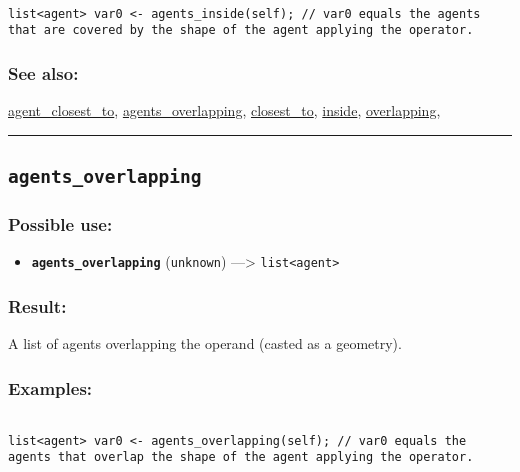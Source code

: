 \documentclass[]{book}
\providecommand{\tightlist}{%
  \setlength{\itemsep}{0pt}\setlength{\parskip}{0pt}}
\theoremstyle{definition}
\theoremstyle{definition}
\theoremstyle{definition}
\theoremstyle{remark}
\begin{document}
\begin{verbatim}
 
list<agent> var0 <- agents_inside(self); // var0 equals the agents that are covered by the shape of the agent applying the operator.
\end{verbatim}

\subsubsection{See also:}\label{see-also-22}

\href{OperatorsAA\#agent_closest_to}{agent\_closest\_to},
\href{OperatorsAA\#agents_overlapping}{agents\_overlapping},
\href{OperatorsBC\#closest_to}{closest\_to},
\href{OperatorsIM\#inside}{inside},
\href{OperatorsNR\#overlapping}{overlapping},

\begin{center}\rule{0.5\linewidth}{\linethickness}\end{center}

\subsection{\texorpdfstring{\texttt{agents\_overlapping}}{agents\_overlapping}}\label{agents_overlapping}

\subsubsection{Possible use:}\label{possible-use-31}

\begin{itemize}
\tightlist
\item
  \textbf{\texttt{agents\_overlapping}} (\texttt{unknown})
  ---\textgreater{} \texttt{list\textless{}agent\textgreater{}}
\end{itemize}

\subsubsection{Result:}\label{result-30}

A list of agents overlapping the operand (casted as a geometry).

\subsubsection{Examples:}\label{examples-24}

\begin{verbatim}
 
list<agent> var0 <- agents_overlapping(self); // var0 equals the agents that overlap the shape of the agent applying the operator.
\end{verbatim}
\end{document}
